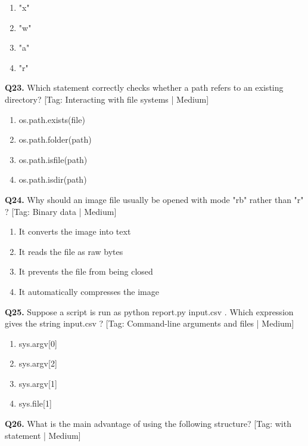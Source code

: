 \begin{enumerate}[label=(\alph*),topsep=2pt,itemsep=1pt,partopsep=0pt,parsep=0pt]
    \item {"x"}
    \item {"w"}
    \item {"a"}
    \item {"r"}
\end{enumerate}
\vspace{2mm}
\noindent\textbf{Q23.} Which statement correctly checks whether a path refers to an existing directory? \hfill [Tag: Interacting with file systems | Medium]
\begin{enumerate}[label=(\alph*),topsep=2pt,itemsep=1pt,partopsep=0pt,parsep=0pt]
    \item {os.path.exists(file)}
    \item {os.path.folder(path)}
    \item {os.path.isfile(path)}
    \item {os.path.isdir(path)}
\end{enumerate}
\vspace{2mm}
\noindent\textbf{Q24.} Why should an image file usually be opened with mode "rb" rather than "r" ? \hfill [Tag: Binary data | Medium]
\begin{enumerate}[label=(\alph*),topsep=2pt,itemsep=1pt,partopsep=0pt,parsep=0pt]
    \item {It converts the image into text}
    \item {It reads the file as raw bytes}
    \item {It prevents the file from being closed}
    \item {It automatically compresses the image}
\end{enumerate}
\vspace{2mm}
\noindent\textbf{Q25.} Suppose a script is run as python report.py input.csv . Which expression gives the string input.csv ? \hfill [Tag: Command-line arguments and files | Medium]
\begin{enumerate}[label=(\alph*),topsep=2pt,itemsep=1pt,partopsep=0pt,parsep=0pt]
    \item {sys.argv[0]}
    \item {sys.argv[2]}
    \item {sys.argv[1]}
    \item {sys.file[1]}
\end{enumerate}
\vspace{2mm}
\noindent\textbf{Q26.} What is the main advantage of using the following structure? \hfill [Tag: with statement | Medium]
